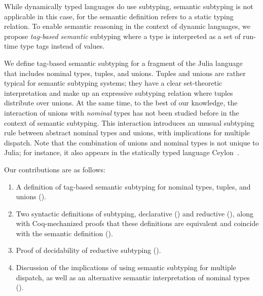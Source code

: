 While dynamically typed languages do use subtyping,
semantic subtyping is not applicable in this case,
for the semantic definition refers to a static typing relation.
To enable semantic reasoning in the context of dynamic languages,
we propose \emph{tag-based semantic} subtyping
where a type is interpreted as a set of run-time type tags 
instead of values. %

We define tag-based semantic subtyping for a fragment 
of the Julia language~\cite{bezanson2017julia}
that includes nominal types, tuples, and unions.
Tuples and unions are rather typical for semantic subtyping systems;
they have a clear set-theoretic interpretation 
and make up an expressive subtyping relation
where tuples distribute over unions.
At the same time, to the best of our knowledge,
the interaction of unions with \emph{nominal} types has not been studied before
in the context of semantic subtyping.
This interaction introduces
an unusual subtyping rule between abstract nominal types and unions,
with implications for multiple dispatch.
Note that the combination of unions and nominal types is not unique to Julia;
for instance, it also appears in the statically typed language 
Ceylon~\cite{bib:CeylonSpec:1:3}.

Our contributions are as follows:
\begin{enumerate}
  \item A definition of tag-based semantic subtyping for 
    nominal types, tuples, and unions ().
  \item Two syntactic definitions of subtyping, 
    declarative () and reductive (),
    along with Coq-mechanized proofs that these definitions are equivalent
    and coincide with the semantic definition (). 	
  \item Proof of decidability of reductive subtyping ().
  \item Discussion of the implications of using semantic subtyping
    for multiple dispatch, as well as an alternative semantic interpretation
    of nominal types ().
\end{enumerate}






